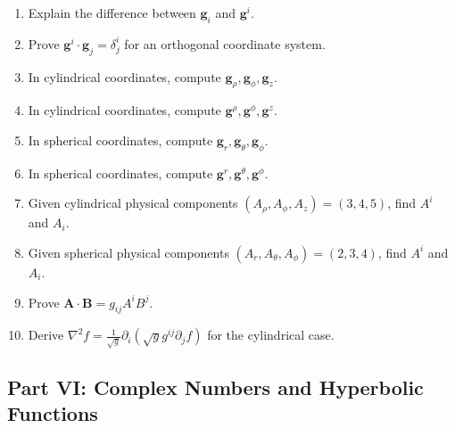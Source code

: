 \documentclass{otscience}
\begin{document}
\begin{practicebox}
\begin{enumerate}
\item Explain the difference between \(\mathbf{g}_i\) and \(\mathbf{g}^i\).
\item Prove \(\mathbf{g}^i\cdot\mathbf{g}_j=\delta^i_j\) for an orthogonal coordinate system.
\item In cylindrical coordinates, compute \(\mathbf{g}_\rho,\mathbf{g}_\phi,\mathbf{g}_z\).
\item In cylindrical coordinates, compute \(\mathbf{g}^\rho,\mathbf{g}^\phi,\mathbf{g}^z\).
\item In spherical coordinates, compute \(\mathbf{g}_r,\mathbf{g}_\theta,\mathbf{g}_\phi\).
\item In spherical coordinates, compute \(\mathbf{g}^r,\mathbf{g}^\theta,\mathbf{g}^\phi\).
\item Given cylindrical physical components \((A_\rho,A_\phi,A_z)=(3,4,5)\), find \(A^i\) and \(A_i\).
\item Given spherical physical components \((A_r,A_\theta,A_\phi)=(2,3,4)\), find \(A^i\) and \(A_i\).
\item Prove \(\mathbf{A}\cdot\mathbf{B}=g_{ij}A^{i}B^j\).
\item Derive \(\nabla^2f=\frac1{\sqrt g}\partial_i(\sqrt g g^{ij}\partial_{j}f)\) for the cylindrical case.
\end{enumerate}
\end{practicebox}

\subsection{Part VI: Complex Numbers and Hyperbolic Functions}
\end{document}
